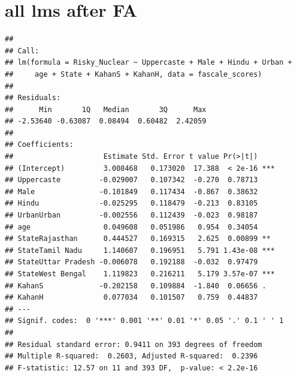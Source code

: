 \documentclass[
]{article}
\begin{document}
\hypertarget{all-lms-after-fa}{%
\section{all lms after FA}\label{all-lms-after-fa}}

\begin{verbatim}
## 
## Call:
## lm(formula = Risky_Nuclear ~ Uppercaste + Male + Hindu + Urban + 
##     age + State + KahanS + KahanH, data = fascale_scores)
## 
## Residuals:
##      Min       1Q   Median       3Q      Max 
## -2.53640 -0.63087  0.08494  0.60482  2.42059 
## 
## Coefficients:
##                     Estimate Std. Error t value Pr(>|t|)    
## (Intercept)         3.008468   0.173020  17.388  < 2e-16 ***
## Uppercaste         -0.029007   0.107342  -0.270  0.78713    
## Male               -0.101849   0.117434  -0.867  0.38632    
## Hindu              -0.025295   0.118479  -0.213  0.83105    
## UrbanUrban         -0.002556   0.112439  -0.023  0.98187    
## age                 0.049608   0.051986   0.954  0.34054    
## StateRajasthan      0.444527   0.169315   2.625  0.00899 ** 
## StateTamil Nadu     1.140607   0.196951   5.791 1.43e-08 ***
## StateUttar Pradesh -0.006078   0.192188  -0.032  0.97479    
## StateWest Bengal    1.119823   0.216211   5.179 3.57e-07 ***
## KahanS             -0.202158   0.109884  -1.840  0.06656 .  
## KahanH              0.077034   0.101507   0.759  0.44837    
## ---
## Signif. codes:  0 '***' 0.001 '**' 0.01 '*' 0.05 '.' 0.1 ' ' 1
## 
## Residual standard error: 0.9411 on 393 degrees of freedom
## Multiple R-squared:  0.2603, Adjusted R-squared:  0.2396 
## F-statistic: 12.57 on 11 and 393 DF,  p-value: < 2.2e-16
\end{verbatim}
\end{document}
